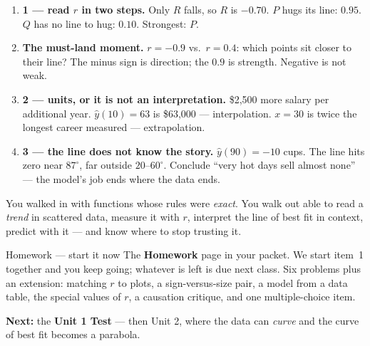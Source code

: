\documentclass[aspectratio=169, 11pt]{beamer}
\begin{document}
\begin{frame}[t, plain]
  \begin{enumerate}\setlength{\itemsep}{5pt}
    \item \textbf{1 --- read $r$ in two steps.} Only $R$ falls, so $R$ is $-0.70$. $P$ hugs its
          line: $0.95$. $Q$ has no line to hug: $0.10$. Strongest: $P$.
    \item \textbf{The must-land moment.} $r=-0.9$ vs.\ $r=0.4$: which points sit closer to
          their line? The minus sign is direction; the $0.9$ is strength. Negative is not weak.
    \item \textbf{2 --- units, or it is not an interpretation.} \$2{,}500 more salary per
          additional year. $\hat y(10)=63$ is \$63{,}000 --- interpolation. $x=30$ is twice the
          longest career measured --- extrapolation.
    \item \textbf{3 --- the line does not know the story.} $\hat y(90)=-10$ cups. The line hits
          zero near $87^\circ$, far outside $20$--$60^\circ$. Conclude ``very hot days sell almost
          none'' --- the model's job ends where the data ends.
  \end{enumerate}
\end{frame}

\begin{frame}[t, plain]
  You walked in with functions whose rules were \emph{exact}. You walk out able to read a
  \emph{trend} in scattered data, measure it with $r$, interpret the line of best fit in context,
  predict with it --- and know where to stop trusting it.
  \vspace{5pt}
  \begin{block}{Homework --- start it now}
    The \textbf{Homework} page in your packet. We start item~1 together and you keep going; whatever
    is left is due next class. Six problems plus an extension: matching $r$ to plots, a
    sign-versus-size pair, a model from a data table, the special values of $r$, a causation
    critique, and one multiple-choice item.
  \end{block}
  \vspace{4pt}
  \textbf{Next:} the \textbf{Unit 1 Test} --- then Unit 2, where the data can \emph{curve} and the
  curve of best fit becomes a parabola.
\end{frame}
\end{document}
